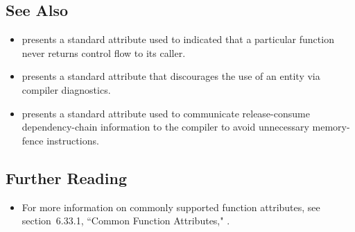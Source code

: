 \hspace{\fill}

\subsection[See Also]{See Also}\label{see-also}

\begin{itemize}
\item{presents a standard attribute used to indicated that a particular function never returns control flow to its caller.}
\item{presents a standard attribute that discourages the use of an entity via compiler diagnostics.}
\item{presents a standard attribute used to communicate release-consume dependency-chain information to the compiler to avoid unnecessary memory-fence instructions.}
\end{itemize}

\subsection[Further Reading]{Further Reading}\label{attribute-further-reading}
\begin{itemize}
\item{For more information on commonly supported function attributes, see
section~6.33.1, ``Common Function Attributes," \cite{freesoftwarefdn20}.}
\end{itemize}


